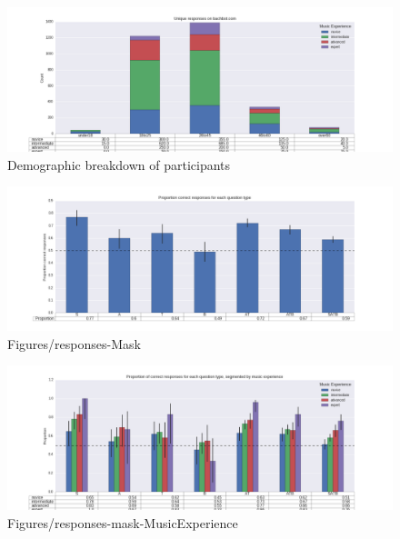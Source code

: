 \documentclass[dissertation.tex]{subfiles}
\begin{document}
\begin{figure}[htpb]
  \centering
  \includegraphics[width=1.0\linewidth]{Figures/responses-ageGroup-musicExperience.png}
  \caption{Demographic breakdown of participants}
  \label{fig:responses-ageGroup-musicExperience}
\end{figure}

\begin{figure}[htpb]
  \centering
  \includegraphics[width=1.0\linewidth]{Figures/responses-mask.png}
  \caption{Figures/responses-Mask}
  \label{fig:responses-mask}
\end{figure}

\begin{figure}[htpb]
  \centering
  \includegraphics[width=1.0\linewidth]{Figures/responses-mask-musicExperience.png}
  \caption{Figures/responses-mask-MusicExperience}
  \label{fig:responses-mask-musicExperience}
\end{figure}
\end{document}
